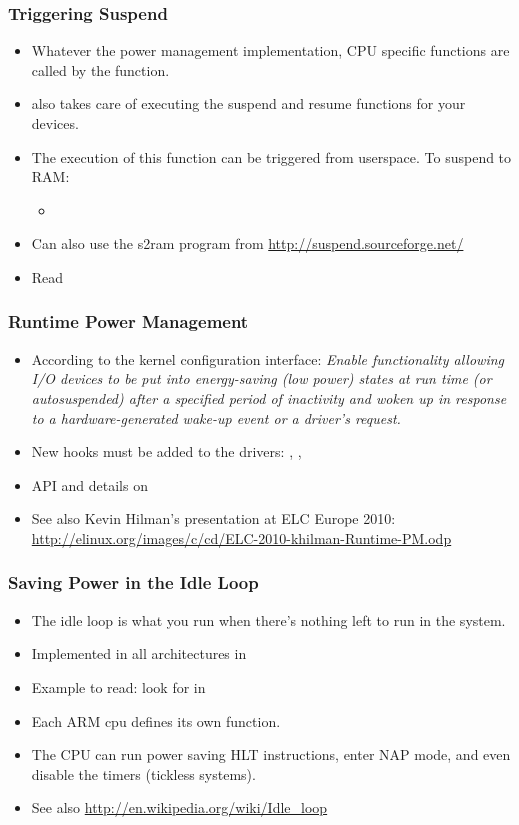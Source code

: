\begin{frame}
  \frametitle{Triggering Suspend}
  \begin{itemize}
  \item Whatever the power management implementation, CPU specific
     functions are called by the 
    function.
  \item {} also takes care of executing the suspend
    and resume functions for your devices.
  \item The execution of this function can be triggered from
    userspace. To suspend to RAM:
    \begin{itemize}
    \item {}
    \end{itemize}
  \item Can also use the s2ram program from
    \url{http://suspend.sourceforge.net/}
  \item Read 
  \end{itemize}
\end{frame}

\begin{frame}
  \frametitle{Runtime Power Management}
  \begin{itemize}
  \item According to the kernel configuration interface: \emph{Enable
      functionality allowing I/O devices to be put into energy-saving
      (low power) states at run time (or autosuspended) after a
      specified period of inactivity and woken up in response to a
      hardware-generated wake-up event or a driver's request.}
  \item New hooks must be added to the drivers:
    , ,
  \item API and details on 
  \item See also Kevin Hilman's presentation at ELC Europe 2010:
    \url{http://elinux.org/images/c/cd/ELC-2010-khilman-Runtime-PM.odp}
  \end{itemize}
\end{frame}

\begin{frame}
  \frametitle{Saving Power in the Idle Loop}
  \begin{itemize}
  \item The idle loop is what you run when there's nothing left to run
    in the system.
  \item Implemented in all architectures in
  \item Example to read: look for  in
  \item Each ARM cpu defines its own  function.
  \item The CPU can run power saving HLT instructions, enter NAP mode,
    and even disable the timers (tickless systems).
  \item See also \url{http://en.wikipedia.org/wiki/Idle_loop}
  \end{itemize}
\end{frame}

